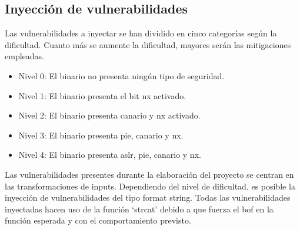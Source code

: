 \subsection{Inyección de vulnerabilidades} \label{subsec:vulns}
Las vulnerabilidades a inyectar se han dividido en cinco categorías según la dificultad.
Cuanto más se aumente la dificultad, mayores serán las mitigaciones empleadas.
\begin{itemize}
    \item Nivel 0: El binario no presenta ningún tipo de seguridad.
    \item Nivel 1: El binario presenta el bit \acrshort{nx} activado.
    \item Nivel 2: El binario presenta canario y \acrshort{nx} activado.
    \item Nivel 3: El binario presenta \acrshort{pie}, canario y \acrshort{nx}.
    \item Nivel 4: El binario presenta \acrshort{aslr}, \acrshort{pie}, canario y \acrshort{nx}.
\end{itemize}
Las vulnerabilidades presentes durante la elaboración del proyecto se centran en las transformaciones de inputs.
Dependiendo del nivel de dificultad, es posible la inyección de vulnerabilidades del tipo format string.
Todas las vulnerabilidades inyectadas hacen uso de la función `strcat' debido a que fuerza el \acrshort{bof} en la función esperada y con el comportamiento previsto.

